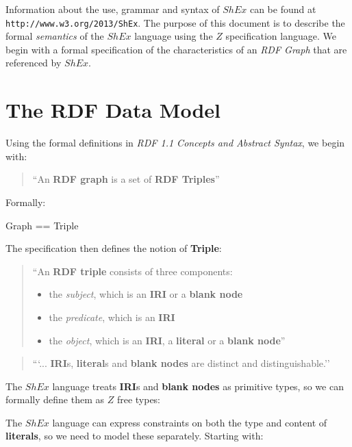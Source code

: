 \documentclass[fuzz]{llncs}
\begin{document}
Information about the use, grammar and syntax of $ShEx$ can be found at \verb#http://www.w3.org/2013/ShEx#. The purpose of this document is to describe the formal \textit{semantics} of the $ShEx$ language using the $Z$ specification language.  We begin with a formal specification of the characteristics of an \textit{RDF Graph} that are referenced by $ShEx$.

\section{The RDF Data Model}
Using the formal definitions in \textit{RDF 1.1 Concepts and Abstract Syntax}\cite{RDF11}, we begin with:
\begin{quote}``An \textbf{RDF graph} is a set of \textbf{RDF Triples}''\end{quote}
Formally:
\begin{zed}
Graph == \power Triple
\end{zed}
The specification then defines the notion of \textbf{Triple}:
\begin{quote}``An \textbf{RDF triple} consists of three components:
\begin{itemize}
\item the \textit{subject}, which is an \textbf{IRI} or a \textbf{blank node}
\item the \textit{predicate}, which is an \textbf{IRI}
\item the \textit{object}, which is an \textbf{IRI}, a \textbf{literal} or a \textbf{blank node}''
\end{itemize}
\end{quote}
\begin{quote}
```... \textbf{IRI}s, \textbf{literal}s and \textbf{blank nodes} are distinct and distinguishable.''
\end{quote} 

The $ShEx$ language treats \textbf{IRI}s and \textbf{blank nodes} as primitive types, so we can formally define them as $Z$ free types:
\begin{zed}
\end{zed}

The $ShEx$ language can express constraints on both the type and content of \textbf{literals}, so we need to model these separately.  Starting with:
\end{document}
